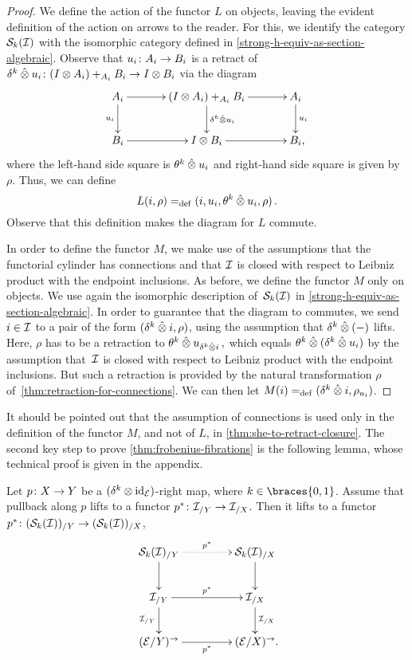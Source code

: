 \documentclass[reqno,10pt,a4paper,oneside,draft]{amsart}
\begin{document}
\begin{proof}
We define the action of the functor $L$ on objects, leaving the evident definition of the action on arrows to the reader.
For this, we identify the category $\cal{S}_k(\cal{I})$ with the isomorphic category defined in \cref{strong-h-equiv-as-section-algebraic}.
Observe that $u_i \co A_i \to B_i$ is a retract of~$\kcyl \hatotimes u_i \co (\interval \otimes A_i) +_{A_i} B_i \to \interval \otimes B_i$ via the diagram
\[
\xymatrix@C+1em{
  A_i \ar[d]_{u_i} \ar[r] & (\interval \otimes A_i) +_{A_i} B_i \ar[r] \ar[d]^{\kcyl \hatotimes u_i } & A_i \ar[d]^{u_i} \\
  B_i \ar[r] & \interval \otimes B_i \ar[r] & B_i \rlap{,}}
\]
where the left-hand side square is $\thetak \hatotimes u_i$ and right-hand side square is given by $\rho$.
Thus, we can define
\[
  L(i, \rho) \defeq (i, u_i, \thetak \hatotimes u_i, \rho)
\, .\]
Observe that this definition makes the diagram for $L$ commute.

\medskip

In order to define the functor $M$, we make use of the assumptions that the functorial cylinder has connections and that $\cal{I}$ is closed with respect to Leibniz product with the endpoint inclusions.
As before, we define the functor $M$ only on objects.
We use again the isomorphic description of~$\cal{S}_k(\cal{I})$ in \cref{strong-h-equiv-as-section-algebraic}.
In order to guarantee that the diagram to commutes, we send $i \in \cal{I}$ to a pair of the form $(\kcyl \hatotimes i, \rho)$, using the assumption that $\kcyl \hatotimes (-)$ lifts.
Here, $\rho$ has to be a retraction to $\thetak \hatotimes u_{\kcyl \hatotimes i}\, ,$ which equals $\thetak \hatotimes (\kcyl \hatotimes u_i)$ by the assumption that~$\cal{I}$ is closed with respect to Leibniz product with the endpoint inclusions.
But such a retraction is provided by the natural transformation $\rho$ of~\cref{thm:retraction-for-connections}.
We can then let $M(i) \defeq (\kcyl \hatotimes i, \rho_{u_i})$.
\end{proof}

It should be pointed out that the assumption of connections is used only in the definition of the functor $M$, and not of $L$, in \cref{thm:she-to-retract-closure}.
The second key step to prove \cref{thm:frobenius-fibrations} is the following lemma, whose technical proof is given in the appendix.


\begin{lemma} \label{strong-h-equiv-base-change-along-fibration}
Let $p \co X \to Y$ be a $(\kcyl \otimes \id_{\calE})$-right map, where $k \in \braces{0, 1}$.
Assume that pullback along $p$ lifts to a functor $p^* \co \cal{I}_{/Y} \to \cal{I}_{/X}$.
Then it lifts to a functor $p^* \co (\cal{S}_k(\cal{I}))_{/Y} \to (\cal{S}_k(\cal{I}))_{/X}$,
\[
\xymatrix@C+2em{
  \cal{S}_k(\cal{I})_{/Y}
  \ar@{.>}[r]^{p^*}
  \ar[d]
&
  \cal{S}_k(\cal{I})_{/X}
  \ar[d]
\\
  \cal{I}_{/Y}
  \ar[r]^{p^*}
  \ar[d]_{\cal{I}_{/Y}}
&
  \cal{I}_{/X}
  \ar[d]^{\cal{I}_{/X}}
\\
  (\catE / Y)^\to
  \ar[r]_{p^*}
&
  (\catE / X)^\to \rlap{.}
}
\]
\end{lemma}
\end{document}
